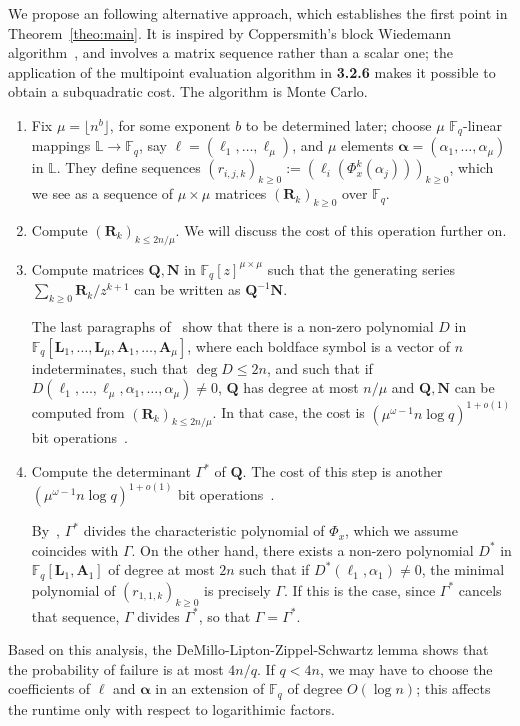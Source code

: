 \documentclass[sigconf]{acmart}
\newcommand{\F}{\mathbb{F}}
\renewcommand{\L}{\mathbb{L}}
\begin{document}
We propose an following alternative approach, which establishes the
first point in Theorem~\ref{theo:main}.  It is inspired by
Coppersmith's block Wiedemann algorithm~\cite{Coppersmith94}, and
involves a matrix sequence rather than a scalar one; the application
of the multipoint evaluation algorithm in {\bf 3.2.6} makes it
possible to obtain a subquadratic cost.  The algorithm is Monte Carlo.
\begin{enumerate}
\item Fix $\mu=\lfloor n^{b} \rfloor$, for some exponent $b$ to be
  determined later; choose $\mu$ $\F_q$-linear mappings $\L\to\F_q$,
  say ${\bm \ell}=(\ell_1,\dots,\ell_\mu)$, and $\mu$ elements ${\bm
    \alpha}=(\alpha_1,\dots,\alpha_\mu)$ in $\L$.  They define
  sequences $(r_{i,j,k})_{k \ge 0} := (\ell_i(\Phi_x^k(\alpha_j)))_{k
    \ge 0}$, which we see as a sequence of $\mu \times \mu$ matrices
  $({\bm R}_k)_{k \ge 0}$ over $\F_q$.
\item Compute $({\bm R}_k)_{k \le 2n/\mu}$. We will discuss 
  the cost of this operation further on.
\item Compute matrices ${\bm Q}, {\bm N}$ in $\F_q[z]^{\mu \times
  \mu}$ such that the generating series $\sum_{k \ge 0} {\bm R}_k /
  z^{k+1}$ can be written as ${\bm Q}^{-1}{\bm N}$. 

  The last paragraphs of~\cite[Section~2.1]{KaVi04} show that there is
  a non-zero polynomial $D$ in $\F_q[{\bm L}_1,\dots,{\bm L}_\mu,{\bm
      A}_1,\dots,{\bm A}_\mu]$, where each boldface symbol is a vector
  of $n$ indeterminates, such that $\deg D \le 2n$, and such that if
  $D({\ell}_1,\dots,{\ell}_\mu,{\alpha}_1,\dots,{\alpha}_\mu)\ne 0$,
  ${\bm Q}$ has degree at most $n/\mu$ and ${\bm Q}, {\bm N}$ can be
  computed from $({\bm R}_k)_{k \le 2n/\mu}$.  In that case,
  the cost is $(\mu^{\omega-1} n \log q)^{1+o(1)}$ bit
  operations~\cite{GiJeVi03}.

\item Compute the determinant $\Gamma^*$ of ${\bm Q}$.  The cost of this step is
  another $(\mu^{\omega-1} n \log q)^{1+o(1)}$ bit
  operations~\cite{LaNeZh17}.
  
  By~\cite[Th.~2.12]{KaVi04}, $\Gamma^*$ divides the characteristic
  polynomial of $\Phi_x$, which we assume coincides with $\Gamma$. On
  the other hand, there exists a non-zero polynomial $D^*$ in
  $\F_q[{\bm L}_1,{\bm A}_1]$ of degree at most $2n$ such that if
  $D^*({\ell}_1,{\alpha}_1)\ne 0$, the minimal polynomial of
  $(r_{1,1,k})_{k \ge 0}$ is precisely $\Gamma$. If this is the case,
  since $\Gamma^*$ cancels that sequence, $\Gamma$ divides $\Gamma^*$,
  so that $\Gamma = \Gamma^*$.
\end{enumerate}
Based on this analysis, the DeMillo-Lipton-Zippel-Schwartz lemma shows
that the probability of failure is at most $4n/q$. If $q < 4n$,
we may have to choose the coefficients of ${\bm \ell}$ and ${\bm
  \alpha}$ in an extension of $\F_q$ of degree $O(\log n)$; this
affects the runtime only with respect to logarithimic factors.
\end{document}
